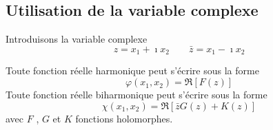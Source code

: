 \subsection{Utilisation de la variable complexe} \label{ssec:Ch08-1.3}
Introduisons la variable complexe 
\begin{equation}
  z=x_1+\imath x_2 \qquad \bar{z}=x_1-\imath x_2
\label{eq:Ch08-027}
\end{equation}
\begin{thmn}
Toute fonction réelle harmonique peut s'écrire sous la forme 
\begin{equation}
    \varphi(x_1,x_2)=\Re \left[ F(z) \right]
    \label{eq:Ch08-028}
\end{equation}
Toute fonction réelle biharmonique peut s'écrire sous la forme 
\begin{equation}
    \chi(x_1,x_2)=\Re \left[ \bar{z}G(z)+K(z) \right]
    \label{eq:Ch08-029}
\end{equation}
avec $F$ , $G$ et $K$ fonctions holomorphes. 
\end{thmn}
